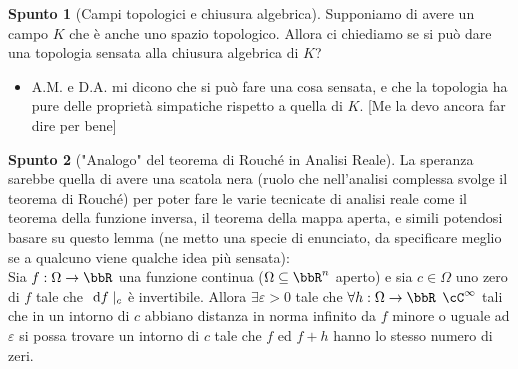 \documentclass[a4paper,NoNotes,GeneralMath]{stdmdoc}
\theoremstyle{definition}
\newtheorem{spunto}{Spunto}
\begin{document}
	\begin{spunto}[Campi topologici e chiusura algebrica]
		Supponiamo di avere un campo $K$ che è anche uno spazio topologico. Allora ci chiediamo se si può dare una topologia sensata alla chiusura algebrica di $K$?
		\begin{itemize}
			\item A.M. e D.A. mi dicono che si può fare una cosa sensata, e che la topologia ha pure delle proprietà simpatiche rispetto a quella di $K$. [Me la devo ancora far dire per bene]
		\end{itemize}
	\end{spunto}
	
	\begin{spunto}["Analogo" del teorema di Rouché in Analisi Reale]
		La speranza sarebbe quella di avere una scatola nera (ruolo che nell'analisi complessa svolge il teorema di Rouché) per poter fare le varie tecnicate di analisi reale come il teorema della funzione inversa, il teorema della mappa aperta, e simili potendosi basare su questo lemma (ne metto una specie di enunciato, da specificare meglio se a qualcuno viene qualche idea più sensata): \\
		Sia $f: \Omega \rar \bbR$ una funzione continua ($\Omega \subseteq \bbR^n$ aperto) e sia $c \in \Omega$ uno zero di $f$ tale che $\de f\mid_c$ è invertibile. Allora $\exists \varepsilon > 0$ tale che $\forall h: \Omega \rar \bbR$ $\cC^\infty$ tali che in un intorno di $c$ abbiano distanza in norma infinito da $f$ minore o uguale ad $\varepsilon$ si possa trovare un intorno di $c$ tale che $f$ ed $f+h$ hanno lo stesso numero di zeri.
	\end{spunto}
	
\end{document}
